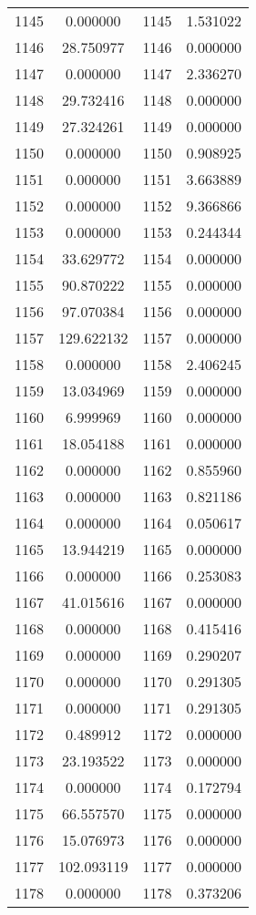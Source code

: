 \documentclass[12pt]{article}
\begin{document}
\begin{longtable}{@{}cccc@{}}
1145 & 0.000000 & 1145 & 1.531022 \\
1146 & 28.750977 & 1146 & 0.000000 \\
1147 & 0.000000 & 1147 & 2.336270 \\
1148 & 29.732416 & 1148 & 0.000000 \\
1149 & 27.324261 & 1149 & 0.000000 \\
1150 & 0.000000 & 1150 & 0.908925 \\
1151 & 0.000000 & 1151 & 3.663889 \\
1152 & 0.000000 & 1152 & 9.366866 \\
1153 & 0.000000 & 1153 & 0.244344 \\
1154 & 33.629772 & 1154 & 0.000000 \\
1155 & 90.870222 & 1155 & 0.000000 \\
1156 & 97.070384 & 1156 & 0.000000 \\
1157 & 129.622132 & 1157 & 0.000000 \\
1158 & 0.000000 & 1158 & 2.406245 \\
1159 & 13.034969 & 1159 & 0.000000 \\
1160 & 6.999969 & 1160 & 0.000000 \\
1161 & 18.054188 & 1161 & 0.000000 \\
1162 & 0.000000 & 1162 & 0.855960 \\
1163 & 0.000000 & 1163 & 0.821186 \\
1164 & 0.000000 & 1164 & 0.050617 \\
1165 & 13.944219 & 1165 & 0.000000 \\
1166 & 0.000000 & 1166 & 0.253083 \\
1167 & 41.015616 & 1167 & 0.000000 \\
1168 & 0.000000 & 1168 & 0.415416 \\
1169 & 0.000000 & 1169 & 0.290207 \\
1170 & 0.000000 & 1170 & 0.291305 \\
1171 & 0.000000 & 1171 & 0.291305 \\
1172 & 0.489912 & 1172 & 0.000000 \\
1173 & 23.193522 & 1173 & 0.000000 \\
1174 & 0.000000 & 1174 & 0.172794 \\
1175 & 66.557570 & 1175 & 0.000000 \\
1176 & 15.076973 & 1176 & 0.000000 \\
1177 & 102.093119 & 1177 & 0.000000 \\
1178 & 0.000000 & 1178 & 0.373206 \\

\end{longtable}
\end{document}
